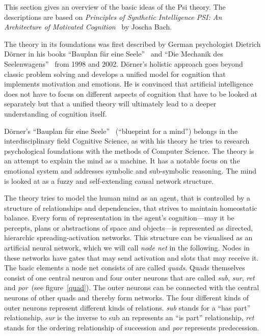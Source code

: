 
This section gives an overview of the basic ideas of the Psi theory. The descriptions are based on \emph{Principles of Synthetic Intelligence PSI: An Architecture of Motivated Cognition}~\cite{Bach:2009:PSI:1611304} by Joscha Bach.

The theory in its foundations was first described by German psychologist Dietrich Dörner in his books ``Bauplan für eine Seele''~\cite{Doerner1998} and ``Die Mechanik des Seelenwagens''~\cite{dorner2002mechanik} from 1998 and 2002. Dörner's holistic approach goes beyond classic problem solving and develops a unified model for cognition that implements motivation and emotions. He is convinced that artificial intelligence does not have to focus on different aspects of cognition that have to be looked at separately but that a unified theory will ultimately lead to a deeper understanding of cognition itself.
    
Dörner's ``Bauplan für eine Seele''~\cite{Doerner1998} (``blueprint for a mind'') belongs in the interdisciplinary field Cognitive Science, as with his theory he tries to research psychological foundations with the methods of Computer Science. The theory is an attempt to explain the mind as a machine. It has a notable focus on the emotional system and addresses symbolic and sub-symbolic reasoning.  The mind is looked at as a fuzzy and self-extending causal network structure.

The theory tries to model the human mind as an agent, that is controlled by a structure of relationships and dependencies, that strives to maintain homeostatic balance. Every form of representation in the agent's cognition---may it be percepts, plans or abstractions of space and objects---is represented as directed, hierarchic spreading-activation networks. This structure can be visualised as an artificial neural network, which we will call \emph{node net} in the following. Nodes in these networks have gates that may send activation and slots that may receive it. The basic elements a node net consists of are called \emph{quads}. Quads themselves consist of one central neuron and four outer neurons that are called \emph{sub}, \emph{sur}, \emph{ret} and \emph{por}~(see figure~\ref{quad}). The outer neurons can be connected with the central neurons of other quads and thereby form networks. The four different kinds of outer neurons represent different kinds of relations. \emph{sub} stands for a ``has part'' relationship, \emph{sur} is the inverse to sub an represents an ``is part'' relationship, \emph{ret} stands for the ordering relationship of succession and \emph{por} represents predecession.


